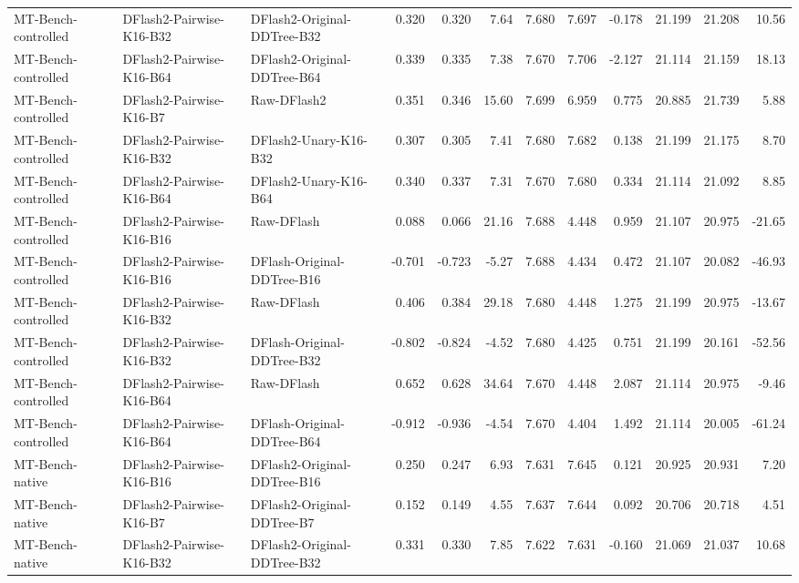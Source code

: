 \begin{longtable}{lllrrrrrrrrr}
MT-Bench-controlled & DFlash2-Pairwise-K16-B32 & DFlash2-Original-DDTree-B32 & 0.320 & 0.320 & 7.64 & 7.680 & 7.697 & -0.178 & 21.199 & 21.208 & 10.56 \\
MT-Bench-controlled & DFlash2-Pairwise-K16-B64 & DFlash2-Original-DDTree-B64 & 0.339 & 0.335 & 7.38 & 7.670 & 7.706 & -2.127 & 21.114 & 21.159 & 18.13 \\
MT-Bench-controlled & DFlash2-Pairwise-K16-B7 & Raw-DFlash2 & 0.351 & 0.346 & 15.60 & 7.699 & 6.959 & 0.775 & 20.885 & 21.739 & 5.88 \\
MT-Bench-controlled & DFlash2-Pairwise-K16-B32 & DFlash2-Unary-K16-B32 & 0.307 & 0.305 & 7.41 & 7.680 & 7.682 & 0.138 & 21.199 & 21.175 & 8.70 \\
MT-Bench-controlled & DFlash2-Pairwise-K16-B64 & DFlash2-Unary-K16-B64 & 0.340 & 0.337 & 7.31 & 7.670 & 7.680 & 0.334 & 21.114 & 21.092 & 8.85 \\
MT-Bench-controlled & DFlash2-Pairwise-K16-B16 & Raw-DFlash & 0.088 & 0.066 & 21.16 & 7.688 & 4.448 & 0.959 & 21.107 & 20.975 & -21.65 \\
MT-Bench-controlled & DFlash2-Pairwise-K16-B16 & DFlash-Original-DDTree-B16 & -0.701 & -0.723 & -5.27 & 7.688 & 4.434 & 0.472 & 21.107 & 20.082 & -46.93 \\
MT-Bench-controlled & DFlash2-Pairwise-K16-B32 & Raw-DFlash & 0.406 & 0.384 & 29.18 & 7.680 & 4.448 & 1.275 & 21.199 & 20.975 & -13.67 \\
MT-Bench-controlled & DFlash2-Pairwise-K16-B32 & DFlash-Original-DDTree-B32 & -0.802 & -0.824 & -4.52 & 7.680 & 4.425 & 0.751 & 21.199 & 20.161 & -52.56 \\
MT-Bench-controlled & DFlash2-Pairwise-K16-B64 & Raw-DFlash & 0.652 & 0.628 & 34.64 & 7.670 & 4.448 & 2.087 & 21.114 & 20.975 & -9.46 \\
MT-Bench-controlled & DFlash2-Pairwise-K16-B64 & DFlash-Original-DDTree-B64 & -0.912 & -0.936 & -4.54 & 7.670 & 4.404 & 1.492 & 21.114 & 20.005 & -61.24 \\
MT-Bench-native & DFlash2-Pairwise-K16-B16 & DFlash2-Original-DDTree-B16 & 0.250 & 0.247 & 6.93 & 7.631 & 7.645 & 0.121 & 20.925 & 20.931 & 7.20 \\
MT-Bench-native & DFlash2-Pairwise-K16-B7 & DFlash2-Original-DDTree-B7 & 0.152 & 0.149 & 4.55 & 7.637 & 7.644 & 0.092 & 20.706 & 20.718 & 4.51 \\
MT-Bench-native & DFlash2-Pairwise-K16-B32 & DFlash2-Original-DDTree-B32 & 0.331 & 0.330 & 7.85 & 7.622 & 7.631 & -0.160 & 21.069 & 21.037 & 10.68 \\

\end{longtable}

